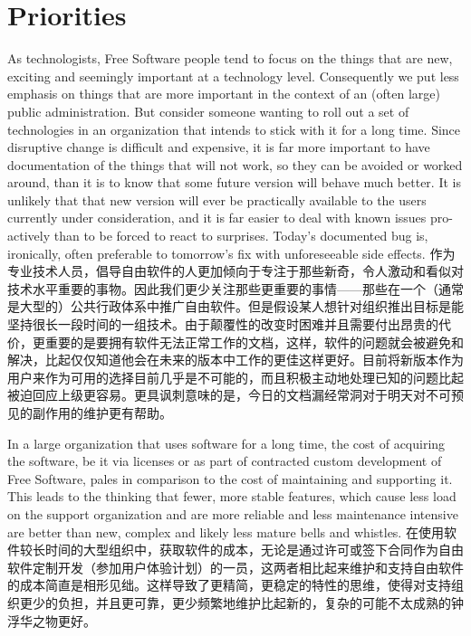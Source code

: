 \section*{Priorities}

As technologists, Free Software people tend to focus on the things that are
new, exciting and seemingly important at a technology level. Consequently we
put less emphasis on things that are more important in the context of an (often
large) public administration. But consider someone wanting to roll out a
set of technologies in an organization that intends to stick with it for a long
time. Since disruptive change is difficult and expensive, it is far more
important to have documentation of the things that will not work, so they can
be avoided or worked around, than it is to know that some future version will
behave much better. It is unlikely that that new version will ever be
practically available to the users currently under consideration, and it is far
easier to deal with known issues pro-actively than to be forced to react to
surprises.  Today's documented bug is, ironically, often preferable to
tomorrow's fix with unforeseeable side effects.
作为专业技术人员，倡导自由软件的人更加倾向于专注于那些新奇，令人激动和看似对技术水平重要的事物。因此我们更少关注那些更重要的事情——那些在一个（通常是大型的）公共行政体系中推广自由软件。但是假设某人想针对组织推出目标是能坚持很长一段时间的一组技术。由于颠覆性的改变时困难并且需要付出昂贵的代价，更重要的是要拥有软件无法正常工作的文档，这样，软件的问题就会被避免和解决，比起仅仅知道他会在未来的版本中工作的更佳这样更好。目前将新版本作为用户来作为可用的选择目前几乎是不可能的，而且积极主动地处理已知的问题比起被迫回应上级更容易。更具讽刺意味的是，今日的文档漏经常洞对于明天对不可预见的副作用的维护更有帮助。

In a large organization that uses software for a long time, the cost of acquiring
the software, be it via licenses or as part of contracted custom development of
Free Software, pales in comparison to the cost of maintaining and supporting it.
This leads to the thinking that fewer, more stable features, which cause less load
on the support organization and are more reliable and less maintenance intensive
are better than new, complex and likely less mature bells and whistles.
在使用软件较长时间的大型组织中，获取软件的成本，无论是通过许可或签下合同作为自由软件定制开发（参加用户体验计划）的一员，这两者相比起来维护和支持自由软件的成本简直是相形见绌。这样导致了更精简，更稳定的特性的思维，使得对支持组织更少的负担，并且更可靠，更少频繁地维护比起新的，复杂的可能不太成熟的钟浮华之物更好。


